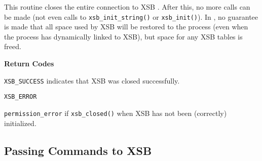 \begin{description}
%
This routine closes the entire connection to XSB .  After this, no
more calls can be made (not even calls to {\tt xsb\_init\_string()} or
{\tt xsb\_init()}).  In \version{}, no guarantee is made that all
space used by XSB will be restored to the process (even when the
process has dynamically linked to XSB), but space for any XSB tables
is freed.

{\bf Return Codes} 
\bi
\item {\tt XSB\_SUCCESS} indicates that XSB was closed successfully.
%
\item {\tt XSB\_ERROR} 
\bi
\item {\tt permission\_error} if {\tt xsb\_closed()} when XSB has not been
(correctly) initialized.  
\ei
%
\ei

\end{description}

\subsection{Passing Commands to XSB}

